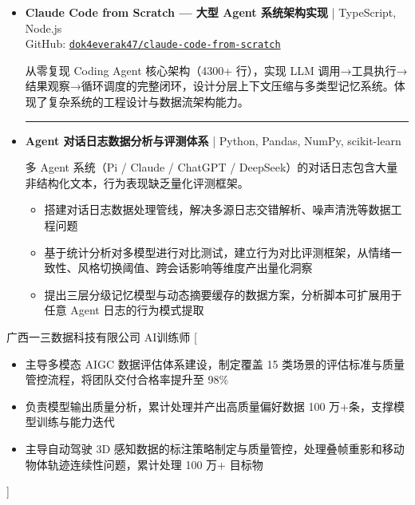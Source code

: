 \documentclass[zh]{resume}
\begin{document}
\begin{itemize}
    \item[\faCode] \textbf{Claude Code from Scratch — 大型 Agent 系统架构实现}
    | TypeScript, Node.js \\
    GitHub: \href{https://github.com/dok4everak47/claude-code-from-scratch}{\texttt{dok4everak47/claude-code-from-scratch}}

    从零复现 Coding Agent 核心架构（4300+ 行），实现 LLM 调用→工具执行→结果观察→循环调度的完整闭环，设计分层上下文压缩与多类型记忆系统。体现了复杂系统的工程设计与数据流架构能力。

    \vspace{1ex}
    {\color{accentcolor!15}\hrule}
    \vspace{1ex}

    \item[\faCode] \textbf{Agent 对话日志数据分析与评测体系} | Python, Pandas, NumPy, scikit-learn

    多 Agent 系统（Pi / Claude / ChatGPT / DeepSeek）的对话日志包含大量非结构化文本，行为表现缺乏量化评测框架。
    \begin{itemize}
        \item 搭建对话日志数据处理管线，解决多源日志交错解析、噪声清洗等数据工程问题
        \item 基于统计分析对多模型进行对比测试，建立行为对比评测框架，从情绪一致性、风格切换阈值、跨会话影响等维度产出量化洞察
        \item 提出三层分级记忆模型与动态摘要缓存的数据方案，分析脚本可扩展用于任意 Agent 日志的行为模式提取
    \end{itemize}
\end{itemize}

\begin{experiences}
    {广西一三数据科技有限公司 \quad AI训练师}%
    [\begin{itemize}
      \item 主导多模态 AIGC 数据评估体系建设，制定覆盖 15 类场景的评估标准与质量管控流程，将团队交付合格率提升至 98\%
      \item 负责模型输出质量分析，累计处理并产出高质量偏好数据 100 万+条，支撑模型训练与能力迭代
      \item 主导自动驾驶 3D 感知数据的标注策略制定与质量管控，处理叠帧重影和移动物体轨迹连续性问题，累计处理 100 万+ 目标物
    \end{itemize}]
\end{experiences}
\end{document}
